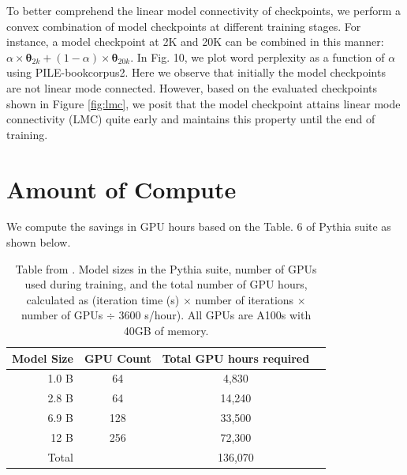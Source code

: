 \documentclass{article}
\newcommand{\params}{\boldsymbol{\theta}}
\begin{document}
To better comprehend the linear model connectivity of checkpoints, we perform a convex combination of model checkpoints at different training stages. For instance, a model checkpoint at 2K and 20K can be combined in this manner: $\alpha \times \params_{2k} + (1 - \alpha) \times \params_{20k}$. In Fig. 10, we plot word perplexity as a function of $\alpha$ using PILE-bookcorpus2. Here we observe that initially the model checkpoints are not linear mode connected. However, based on the evaluated checkpoints shown in Figure \ref{fig:lmc}, we posit that the model checkpoint attains linear mode connectivity (LMC) quite early and maintains this property until the end of training.

\section{Amount of Compute} \label{sec:comp}
We compute the savings in GPU hours based on the Table. 6 of Pythia suite \cite{biderman2023pythia} as shown below.

\begin{table}[h]
    \centering
    \begin{tabular}{rccc}\toprule
  Model Size & GPU Count & Total GPU hours required\\\midrule
         1.0 B  & 64 & 4,830 \\
         2.8 B  & 64 & 14,240\\
         6.9 B  & 128 & 33,500 \\
         12 B   & 256 & 72,300 \\\midrule
         Total   &  & 136,070 \\\bottomrule
    \end{tabular}
    \vspace{0.5em}
    \caption{Table from \cite{biderman2023pythia}. Model sizes in the Pythia suite, number of GPUs used during training, and the total number of GPU hours, calculated as (iteration time (s) $\times$ number of iterations $\times$ number of GPUs $\div$ 3600 s/hour). All GPUs are A100s with 40GB of memory.}
	\label{table:hardware}
\end{table}
\end{document}
